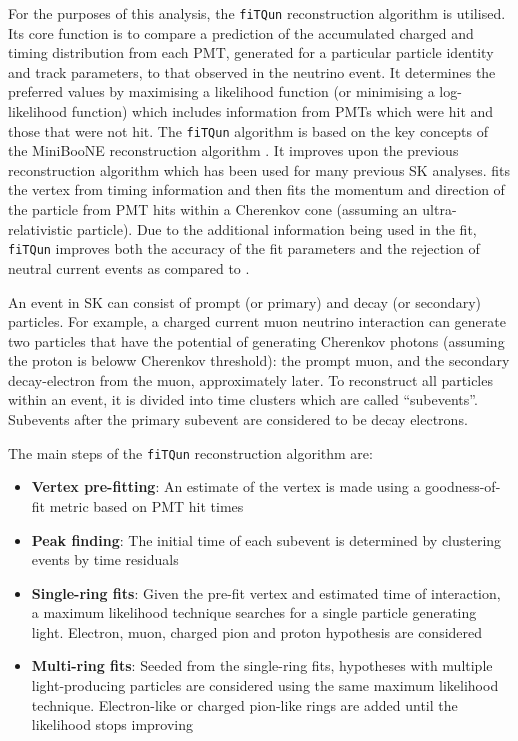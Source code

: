 For the purposes of this analysis, the \texttt{fiTQun} reconstruction algorithm \cite{t2k_tn_146} is utilised. Its core function is to compare a prediction of the accumulated charged and timing distribution from each PMT, generated for a particular particle identity and track parameters, to that observed in the neutrino event. It determines the preferred values by maximising a likelihood function (or minimising a log-likelihood function) which includes information from PMTs which were hit and those that were not hit. The \texttt{fiTQun} algorithm is based on the key concepts of the MiniBooNE reconstruction algorithm \cite{Patterson_2009}. It improves upon the previous \apfit reconstruction algorithm which has been used for many previous SK analyses. \apfit fits the vertex from timing information and then fits the momentum and direction of the particle from PMT hits within a \quickmath{43\deg} Cherenkov cone (assuming an ultra-relativistic particle). Due to the additional information being used in the fit, \texttt{fiTQun} improves both the accuracy of the fit parameters and the rejection of neutral current  events as compared to \apfit \cite{Abe2018, Abe2015}.

An event in SK can consist of prompt (or primary) and decay (or secondary) particles. For example, a charged current muon neutrino interaction can generate two particles that have the potential of generating Cherenkov photons (assuming the proton is beloww Cherenkov threshold): the prompt muon, and the secondary decay-electron from the muon, approximately  later. To reconstruct all particles within an event, it is divided into time clusters which are called ``subevents''. Subevents after the primary subevent are considered to be decay electrons.

The main steps of the \texttt{fiTQun} reconstruction algorithm are:

\begin{itemize}
\item \textbf{Vertex pre-fitting}: An estimate of the vertex is made using a goodness-of-fit metric based on PMT hit times
\item \textbf{Peak finding}: The initial time of each subevent is determined by clustering events by time residuals
\item \textbf{Single-ring fits}: Given the pre-fit vertex and estimated time of interaction, a maximum likelihood technique searches for a single particle generating light. Electron, muon, charged pion and proton hypothesis are considered
\item \textbf{Multi-ring fits}: Seeded from the single-ring fits, hypotheses with multiple light-producing particles are considered using the same maximum likelihood technique. Electron-like or charged pion-like rings are added until the likelihood stops improving
\end{itemize}

